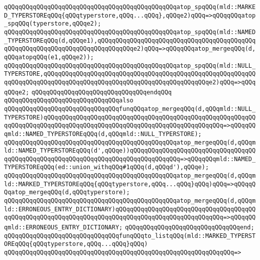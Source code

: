 \verb|qQQqqQQqqQQqqQQqqQQqqQQqqQQqqQQqqQQqqQQqqQQqqQQqatop_spqQQq(mld::MARKED_TYPERSTOREqQQq{qQQqtyperstore,qQQq...qQQq},qQQqe2)qQQq=>qQQqqQQqatop_spqQQq(typerstore,qQQqe2);|\newline
\verb|qQQqqQQqqQQqqQQqqQQqqQQqqQQqqQQqqQQqqQQqqQQqqQQqatop_spqQQq(mld::NAMED_TYPERSTOREqQQq(d,qQQqe1),qQQqqQQqqQQqqQQqqQQqqQQqqQQqqQQqqQQqqQQqqQQqqQQqqQQqqQQqqQQqqQQqqQQqqQQqqQQqqQQqe2)qQQq=>qQQqqQQqatop_mergeqQQq(d,qQQqatopqQQq(e1,qQQqe2));|\newline
\verb|qQQqqQQqqQQqqQQqqQQqqQQqqQQqqQQqqQQqqQQqqQQqqQQqatop_spqQQq(mld::NULL_TYPERSTORE,qQQqqQQqqQQqqQQqqQQqqQQqqQQqqQQqqQQqqQQqqQQqqQQqqQQqqQQqqQQqqQQqqQQqqQQqqQQqqQQqqQQqqQQqqQQqqQQqqQQqqQQqqQQqqQQqqQQqe2)qQQq=>qQQqqQQqe2;|\newline
\verb|qQQqqQQqqQQqqQQqqQQqqQQqqQQqqQQqendqQQq|\newline
\newline
\verb|qQQqqQQqqQQqqQQqqQQqqQQqqQQqqQQqalso|\newline
\verb|qQQqqQQqqQQqqQQqqQQqqQQqqQQqqQQqfunqQQqatop_mergeqQQq(d,qQQqmld::NULL_TYPERSTORE)qQQqqQQqqQQqqQQqqQQqqQQqqQQqqQQqqQQqqQQqqQQqqQQqqQQqqQQqqQQqqQQqqQQqqQQqqQQqqQQqqQQqqQQqqQQqqQQqqQQqqQQqqQQqqQQqqQQqqQQq=>qQQqqQQqmld::NAMED_TYPERSTOREqQQq(d,qQQqmld::NULL_TYPERSTORE);|\newline
\verb|qQQqqQQqqQQqqQQqqQQqqQQqqQQqqQQqqQQqqQQqqQQqqQQqatop_mergeqQQq(d,qQQqmld::NAMED_TYPERSTOREqQQq(d',qQQqe))qQQqqQQqqQQqqQQqqQQqqQQqqQQqqQQqqQQqqQQqqQQqqQQqqQQqqQQqqQQqqQQqqQQqqQQqqQQqqQQqqQQq=>qQQqqQQqmld::NAMED_TYPERSTOREqQQq(ed::union_withqQQq#1qQQq(d,qQQqd'),qQQqe);|\newline
\verb|qQQqqQQqqQQqqQQqqQQqqQQqqQQqqQQqqQQqqQQqqQQqqQQqatop_mergeqQQq(d,qQQqmld::MARKED_TYPERSTOREqQQq{qQQqtyperstore,qQQq...qQQq}qQQq)qQQq=>qQQqqQQqatop_mergeqQQq(d,qQQqtyperstore);|\newline
\verb|qQQqqQQqqQQqqQQqqQQqqQQqqQQqqQQqqQQqqQQqqQQqqQQqatop_mergeqQQq(d,qQQqmld::ERRONEOUS_ENTRY_DICTIONARY)qQQqqQQqqQQqqQQqqQQqqQQqqQQqqQQqqQQqqQQqqQQqqQQqqQQqqQQqqQQqqQQqqQQqqQQqqQQqqQQqqQQqqQQqqQQqqQQqqQQq=>qQQqqQQqmld::ERRONEOUS_ENTRY_DICTIONARY;|\newline
\verb|qQQqqQQqqQQqqQQqqQQqqQQqqQQqqQQqend;|\newline
\newline
\verb|qQQqqQQqqQQqqQQqqQQqqQQqqQQqqQQqfunqQQqto_listqQQq(mld::MARKED_TYPERSTOREqQQq{qQQqtyperstore,qQQq...qQQq}qQQq)|\newline
\verb|qQQqqQQqqQQqqQQqqQQqqQQqqQQqqQQqqQQqqQQqqQQqqQQqqQQqqQQqqQQqqQQq=>|\newline
